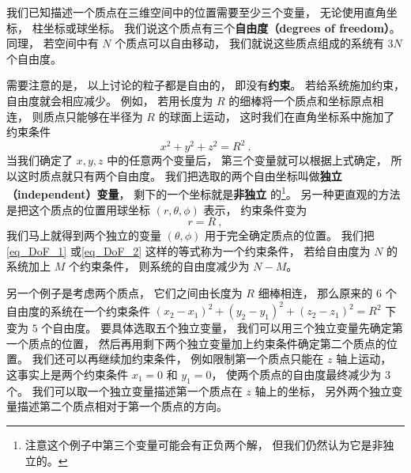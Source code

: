 

我们已知描述一个质点在三维空间中的位置需要至少三个变量， 无论使用直角坐标， 柱坐标或球坐标。 我们说这个质点有三个\textbf{自由度（degrees of freedom）}。 同理， 若空间中有 $N$ 个质点可以自由移动， 我们就说这些质点组成的系统有 $3N$ 个自由度。

需要注意的是， 以上讨论的粒子都是自由的， 即没有\textbf{约束}。 若给系统施加约束， 自由度就会相应减少。 例如， 若用长度为 $R$ 的细棒将一个质点和坐标原点相连， 则质点只能够在半径为 $R$ 的球面上运动， 这时我们在直角坐标系中施加了约束条件
\begin{equation}\label{eq_DoF_1}
x^2 + y^2 + z^2 = R^2~.
\end{equation}
当我们确定了 $x, y, z$ 中的任意两个变量后， 第三个变量就可以根据上式确定， 所以这时质点就只有两个自由度。 我们把选取的两个自由坐标叫做\textbf{独立（independent）变量}， 剩下的一个坐标就是\textbf{非独立} 的\footnote{注意这个例子中第三个变量可能会有正负两个解， 但我们仍然认为它是非独立的。}。 另一种更直观的方法是把这个质点的位置用球坐标 $(r, \theta, \phi)$ 表示， 约束条件变为
\begin{equation}\label{eq_DoF_2}
r = R~,
\end{equation}
我们马上就得到两个独立的变量 $(\theta, \phi)$ 用于完全确定质点的位置。 我们把\autoref{eq_DoF_1} 或\autoref{eq_DoF_2} 这样的等式称为一个约束条件， 若给自由度为 $N$ 的系统加上 $M$ 个约束条件， 则系统的自由度减少为 $N - M$。

另一个例子是考虑两个质点， 它们之间由长度为 $R$ 细棒相连， 那么原来的 $6$ 个自由度的系统在一个约束条件 $(x_2 - x_1)^2 + (y_2 - y_1)^2 + (z_2 - z_1)^2 = R^2$ 下变为 $5$ 个自由度。 要具体选取五个独立变量， 我们可以用三个独立变量先确定第一个质点的位置， 然后再用剩下两个独立变量加上约束条件确定第二个质点的位置。 我们还可以再继续加约束条件， 例如限制第一个质点只能在 $z$ 轴上运动， 这事实上是两个约束条件 $x_1 = 0$ 和 $y_1 = 0$， 使两个质点的自由度最终减少为 3 个。 我们可以取一个独立变量描述第一个质点在 $z$ 轴上的坐标， 另外两个独立变量描述第二个质点相对于第一个质点的方向。

